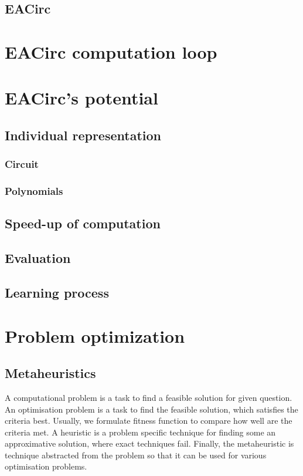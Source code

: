 \documentclass[
  print, %
  Table,   %
  nolof,     %
  nolot,     %
  draft, %
  11pt, %
  oneside  %
]{fithesis3}
\begin{document}
\subsection{EACirc}

\section{EACirc computation loop}

\section{EACirc's potential}

\subsection{Individual representation}

\subsubsection{Circuit}

\subsubsection{Polynomials}

\subsection{Speed-up of computation}

\subsection{Evaluation}

\subsection{Learning process}

\section{Problem optimization}

\subsection{Metaheuristics}

A computational problem is a task to find a feasible solution for given question. An optimisation problem is a task to find the feasible solution, which satisfies the criteria best. Usually, we formulate fitness function to compare how well are the criteria met. A heuristic is a problem specific technique for finding some an approximative solution, where exact techniques fail. Finally, the metaheuristic is technique abstracted from the problem so that it can be used for various optimisation problems.
\end{document}
